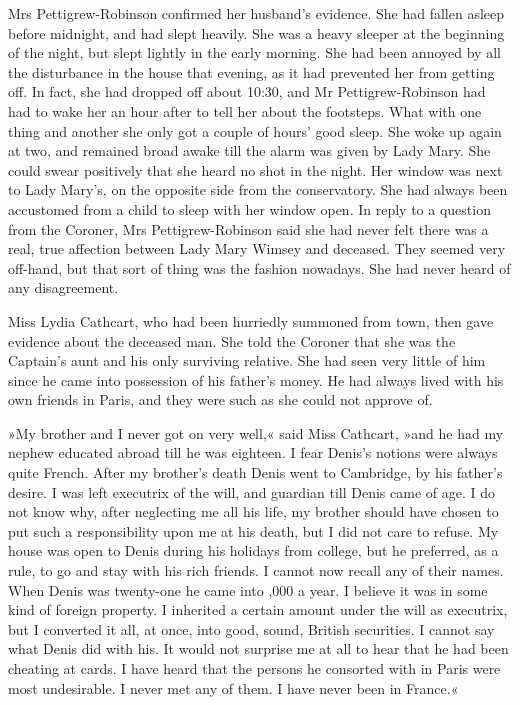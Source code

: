 Mrs Pettigrew-Robinson confirmed her husband's evidence. She had fallen asleep before midnight, and had slept heavily. She was a heavy sleeper at the beginning of the night, but slept lightly in the early morning. She had been annoyed by all the disturbance in the house that evening, as it had prevented her from getting off. In fact, she had dropped off about 10:30, and Mr Pettigrew-Robinson had had to wake her an hour after to tell her about the footsteps. What with one thing and another she only got a couple of hours' good sleep. She woke up again at two, and remained broad awake till the alarm was given by Lady Mary. She could swear positively that she heard no shot in the night. Her window was next to Lady Mary's, on the opposite side from the conservatory. She had always been accustomed from a child to sleep with her window open. In reply to a question from the Coroner, Mrs  Pettigrew-Robinson said she had never felt there was a real, true affection between Lady Mary Wimsey and deceased. They seemed very off-hand, but that sort of thing was the fashion nowadays. She had never heard of any disagreement.

Miss Lydia Cathcart, who had been hurriedly summoned from town, then gave evidence about the deceased man. She told the Coroner that she was the Captain's aunt and his only surviving relative. She had seen very little of him since he came into possession of his father's money. He had always lived with his own friends in Paris, and they were such as she could not approve of.

»My brother and I never got on very well,« said Miss Cathcart, »and he had my nephew educated abroad till he was eighteen. I fear Denis's notions were always quite French. After my brother's death Denis went to Cambridge, by his father's desire. I was left executrix of the will, and guardian till Denis came of age. I do not know why, after neglecting me all his life, my brother should have chosen to put such a responsibility upon me at his death, but I did not care to refuse.  My house was open to Denis during his holidays from college, but he preferred, as a rule, to go and stay with his rich friends. I cannot now recall any of their names. When Denis was twenty-one he came into ,000 a year. I believe it was in some kind of foreign property. I inherited a certain amount under the will as executrix, but I converted it all, at once, into good, sound, British securities. I cannot say what Denis did with his. It would not surprise me at all to hear that he had been cheating at cards. I have heard that the persons he consorted with in Paris were most undesirable. I never met any of them.  I have never been in France.«

